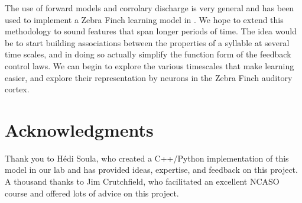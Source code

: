 \documentclass{article} %
\DeclareMathOperator*{\argmin}{\arg\!\min}
\DeclareMathOperator*{\argmax}{\arg\!\max}
\begin{document}
The use of forward models and corrolary discharge is very general and has been used
to implement a Zebra Finch learning model in \cite{Troyer2000a}. We hope to extend
this methodology to sound features that span longer periods of time. The idea would
be to start building associations between the properties of a syllable at several
time scales, and in doing so actually simplify the function form of the feedback
control laws. We can begin to explore the various timescales that make learning
easier, and explore their representation by neurons in the Zebra Finch auditory cortex.

\section*{Acknowledgments}

Thank you to H\'{e}di Soula, who created a C++/Python implementation of this model in our lab
and has provided ideas, expertise, and feedback on this project. A thousand thanks to Jim Crutchfield,
who facilitated an excellent NCASO course and offered lots of advice on this project.



\end{document}
